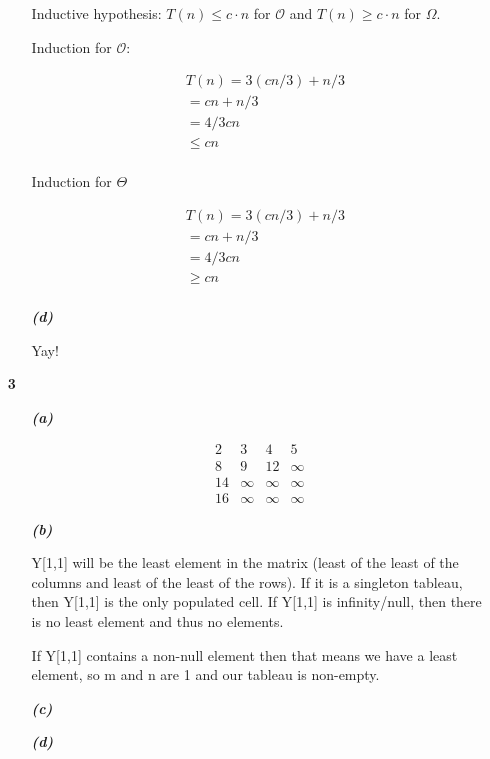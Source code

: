 \documentclass{article}
\begin{document}
\begin{enumerate}
\begin{enumerate}
		Inductive hypothesis: $T(n) \leq c \cdot n$ for $\mathcal{O}$ and $T(n) \geq c \cdot n$ for $\Omega$.

		Induction for $\mathcal{O}$:

		\begin{align*}
		& T(n) = 3(cn/3) + n/3 \\
		& = cn + n/3 \\
		& = 4/3cn \\
		& \leq cn \\
		\end{align*}

		Induction for $\Theta$

		\begin{align*}
		& T(n) = 3(cn/3) + n/3 \\
		& = cn + n/3 \\
		& = 4/3cn \\
		& \geq cn \\
		\end{align*}

		\item[\textbf{\emph{{(d)}}}]

		Yay!

	\end{enumerate}

\item[\textbf{3}]

	\begin{enumerate}

		\item[\textbf{\emph{{(a)}}}]

		\[ \begin{matrix}
		2 & 3 & 4 & 5\\
		8 & 9 & 12 & \infty \\
		14 & \infty & \infty & \infty  \\
		16 & \infty & \infty & \infty 
		\end{matrix} \]

		\item[\textbf{\emph{{(b)}}}]

		Y[1,1] will be the least element in the matrix (least of the least of the
		columns and least of the least of the rows). If it is a singleton tableau,
		then Y[1,1] is the only populated cell. If Y[1,1] is infinity/null, then
		there is no least element and thus no elements.

		If Y[1,1] contains a non-null element then that means we have a least
		element, so m and n are 1 and our tableau is non-empty.

		\item[\textbf{\emph{{(c)}}}]


		\item[\textbf{\emph{{(d)}}}]

	\end{enumerate}

\end{enumerate}
\end{document}
